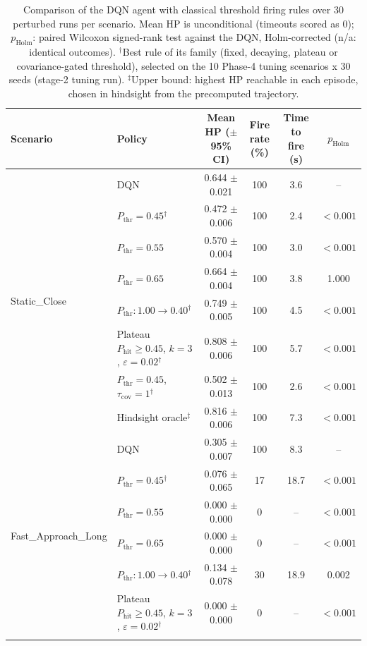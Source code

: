 \begin{table}[htbp]
\centering
\caption{Comparison of the DQN agent with classical threshold firing rules over 30 perturbed runs per scenario. Mean HP is unconditional (timeouts scored as 0); $p_{\mathrm{Holm}}$: paired Wilcoxon signed-rank test against the DQN, Holm-corrected (n/a: identical outcomes). $^{\dagger}$Best rule of its family (fixed, decaying, plateau or covariance-gated threshold), selected on the 10 Phase-4 tuning scenarios x 30 seeds (stage-2 tuning run). $^{\ddagger}$Upper bound: highest HP reachable in each episode, chosen in hindsight from the precomputed trajectory.}
\label{tab:comparison-traditional-rl}
\small
\begin{tabular}{llcccc}
\toprule
\textbf{Scenario} & \textbf{Policy} & \textbf{Mean HP ($\pm$95\% CI)} & \textbf{Fire rate (\%)} & \textbf{Time to fire (s)} & $p_{\mathrm{Holm}}$ \\
\midrule
\multirow{8}{*}{Static\_Close} & DQN & 0.644 $\pm$ 0.021 & 100 & 3.6 & -- \\
 & $P_{\mathrm{thr}}=0.45$$^{\dagger}$ & 0.472 $\pm$ 0.006 & 100 & 2.4 & $<0.001$ \\
 & $P_{\mathrm{thr}}=0.55$ & 0.570 $\pm$ 0.004 & 100 & 3.0 & $<0.001$ \\
 & $P_{\mathrm{thr}}=0.65$ & 0.664 $\pm$ 0.004 & 100 & 3.8 & 1.000 \\
 & $P_{\mathrm{thr}}: 1.00 \to 0.40$$^{\dagger}$ & 0.749 $\pm$ 0.005 & 100 & 4.5 & $<0.001$ \\
 & Plateau $P_{\mathrm{hit}}\geq0.45$, $k=3$, $\varepsilon=0.02$$^{\dagger}$ & 0.808 $\pm$ 0.006 & 100 & 5.7 & $<0.001$ \\
 & $P_{\mathrm{thr}}=0.45$, $\tau_{\mathrm{cov}}=1$$^{\dagger}$ & 0.502 $\pm$ 0.013 & 100 & 2.6 & $<0.001$ \\
 & Hindsight oracle$^{\ddagger}$ & 0.816 $\pm$ 0.006 & 100 & 7.3 & $<0.001$ \\
\midrule
\multirow{8}{*}{Fast\_Approach\_Long} & DQN & 0.305 $\pm$ 0.007 & 100 & 8.3 & -- \\
 & $P_{\mathrm{thr}}=0.45$$^{\dagger}$ & 0.076 $\pm$ 0.065 & 17 & 18.7 & $<0.001$ \\
 & $P_{\mathrm{thr}}=0.55$ & 0.000 $\pm$ 0.000 & 0 & -- & $<0.001$ \\
 & $P_{\mathrm{thr}}=0.65$ & 0.000 $\pm$ 0.000 & 0 & -- & $<0.001$ \\
 & $P_{\mathrm{thr}}: 1.00 \to 0.40$$^{\dagger}$ & 0.134 $\pm$ 0.078 & 30 & 18.9 & 0.002 \\
 & Plateau $P_{\mathrm{hit}}\geq0.45$, $k=3$, $\varepsilon=0.02$$^{\dagger}$ & 0.000 $\pm$ 0.000 & 0 & -- & $<0.001$ \\
$$
\end{tabular}
\end{table}
